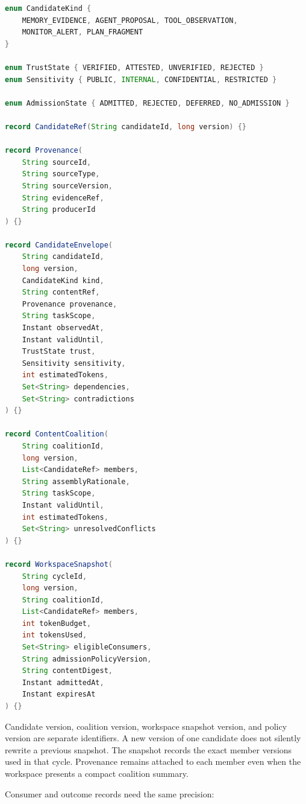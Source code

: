 \begin{lstlisting}[language=Java,caption={Proposed candidate, coalition, and workspace contracts.},label={lst:ch14-workspace-records}]
enum CandidateKind {
    MEMORY_EVIDENCE, AGENT_PROPOSAL, TOOL_OBSERVATION,
    MONITOR_ALERT, PLAN_FRAGMENT
}

enum TrustState { VERIFIED, ATTESTED, UNVERIFIED, REJECTED }
enum Sensitivity { PUBLIC, INTERNAL, CONFIDENTIAL, RESTRICTED }

enum AdmissionState { ADMITTED, REJECTED, DEFERRED, NO_ADMISSION }

record CandidateRef(String candidateId, long version) {}

record Provenance(
    String sourceId,
    String sourceType,
    String sourceVersion,
    String evidenceRef,
    String producerId
) {}

record CandidateEnvelope(
    String candidateId,
    long version,
    CandidateKind kind,
    String contentRef,
    Provenance provenance,
    String taskScope,
    Instant observedAt,
    Instant validUntil,
    TrustState trust,
    Sensitivity sensitivity,
    int estimatedTokens,
    Set<String> dependencies,
    Set<String> contradictions
) {}

record ContentCoalition(
    String coalitionId,
    long version,
    List<CandidateRef> members,
    String assemblyRationale,
    String taskScope,
    Instant validUntil,
    int estimatedTokens,
    Set<String> unresolvedConflicts
) {}

record WorkspaceSnapshot(
    String cycleId,
    long version,
    String coalitionId,
    List<CandidateRef> members,
    int tokenBudget,
    int tokensUsed,
    Set<String> eligibleConsumers,
    String admissionPolicyVersion,
    String contentDigest,
    Instant admittedAt,
    Instant expiresAt
) {}
\end{lstlisting}

Candidate version, coalition version, workspace snapshot version, and policy version are separate identifiers. A new version of one candidate does not silently rewrite a previous snapshot. The snapshot records the exact member versions used in that cycle. Provenance remains attached to each member even when the workspace presents a compact coalition summary.

Consumer and outcome records need the same precision:


